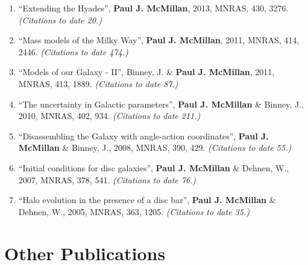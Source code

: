 \documentclass{resume}
\begin{document}
\begin{enumerate}
\item ``Extending the Hyades'', \textbf{Paul J. McMillan}, 2013, MNRAS, 430, 3276. \textit{(Citations to date 20.)}

\item ``Mass models of the Milky Way'', \textbf{Paul J. McMillan}, 2011, MNRAS, 414, 2446. \textit{(Citations to date 474.)}

\item ``Models of our Galaxy - II'', Binney, J. \& \textbf{Paul J. McMillan}, 2011, MNRAS, 413, 1889. \textit{(Citations to date 87.)}

\item ``The uncertainty in Galactic parameters'', \textbf{Paul J. McMillan} \& Binney, J., 2010, MNRAS, 402, 934. \textit{(Citations to date 211.)}

\item ``Disassembling the Galaxy with angle-action coordinates'', \textbf{Paul J. McMillan} \& Binney, J., 2008, MNRAS, 390, 429. \textit{(Citations to date 55.)}

\item ``Initial conditions for disc galaxies'', \textbf{Paul J. McMillan} \& Dehnen, W., 2007, MNRAS, 378, 541. \textit{(Citations to date 76.)}

\item ``Halo evolution in the presence of a disc bar'', \textbf{Paul J. McMillan} \& Dehnen, W., 2005, MNRAS, 363, 1205. \textit{(Citations to date 35.)}

\end{enumerate}\section*{Other Publications}
\end{document}
